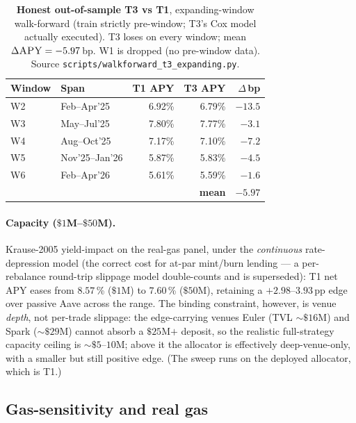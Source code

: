 \begin{table}[t]
  \centering
  \caption{\textbf{Honest out-of-sample T3 vs T1}, expanding-window
    walk-forward (train strictly pre-window; T3's Cox model actually
    executed).  T3 loses on every window; mean
    $\Delta\textsc{APY} = -5.97$\,bp.  W1 is dropped
    (no pre-window data). Source
    \texttt{scripts/walkforward\_t3\_expanding.py}.}
  \label{tab:wf-t3-vs-t1}
  \setlength{\tabcolsep}{4pt}
  \begin{tabular}{llrrr}
    \toprule
    Window & Span & T1 APY & T3 APY & $\Delta$\,bp \\
    \midrule
    W2 & Feb--Apr'25    & 6.92\% & 6.79\% & $-13.5$ \\
    W3 & May--Jul'25    & 7.80\% & 7.77\% & $-3.1$ \\
    W4 & Aug--Oct'25    & 7.17\% & 7.10\% & $-7.2$ \\
    W5 & Nov'25--Jan'26 & 5.87\% & 5.83\% & $-4.5$ \\
    W6 & Feb--Apr'26    & 5.61\% & 5.59\% & $-1.6$ \\
    \midrule
    \multicolumn{4}{r}{\textbf{mean}} & $\mathbf{-5.97}$ \\
    \bottomrule
  \end{tabular}
\end{table}

\paragraph{Capacity ($\$1$M--$\$50$M).} Krause-2005 yield-impact on the
real-gas panel, under the \emph{continuous} rate-depression model (the
correct cost for at-par mint/burn lending --- a per-rebalance round-trip
slippage model double-counts and is superseded): T1 net APY eases from
$8.57$\,\% ($\$1$M) to $7.60$\,\% ($\$50$M), retaining a
$+2.98$--$3.93$\,pp edge over passive Aave across the range. The binding
constraint, however, is venue \emph{depth}, not per-trade slippage: the
edge-carrying venues Euler (TVL $\sim\$16$M) and Spark ($\sim\$29$M)
cannot absorb a $\$25$M$+$ deposit, so the realistic full-strategy
capacity ceiling is $\sim\$5$--$10$M; above it the allocator is
effectively deep-venue-only, with a smaller but still positive edge.
(The sweep runs on the deployed allocator, which is T1.)

\subsection{Gas-sensitivity and real gas}
\label{sec:emp-gas}


